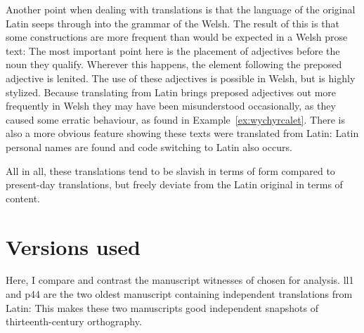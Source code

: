 Another point when dealing with translations is that the language of the original Latin seeps through into the grammar of the Welsh.
The result of this is that some constructions are more frequent than would be expected in a Welsh prose text:
The most important point here is the placement of adjectives before the noun they qualify.
Wherever this happens, the element following the preposed adjective is lenited.
The use of these adjectives is possible in Welsh, but is highly stylized.
Because translating from Latin brings preposed adjectives out more frequently in Welsh they may have been misunderstood occasionally, as they caused some erratic behaviour, as found in Example~\ref{ex:wychyrcalet}.
There is also a more obvious feature showing these texts were translated from Latin: Latin personal names are found and code switching to Latin also occurs.  

All in all, these translations tend to be slavish in terms of form compared to present-day translations, but freely deviate from the Latin original in terms of content. 





\section{Versions used}
Here, I compare and contrast the manuscript witnesses of  chosen for analysis.
\Gls{ll1} and \gls{p44} are the two oldest manuscript containing independent translations from Latin:
This makes these two manuscripts good independent snapshots of
thirteenth-century orthography.

